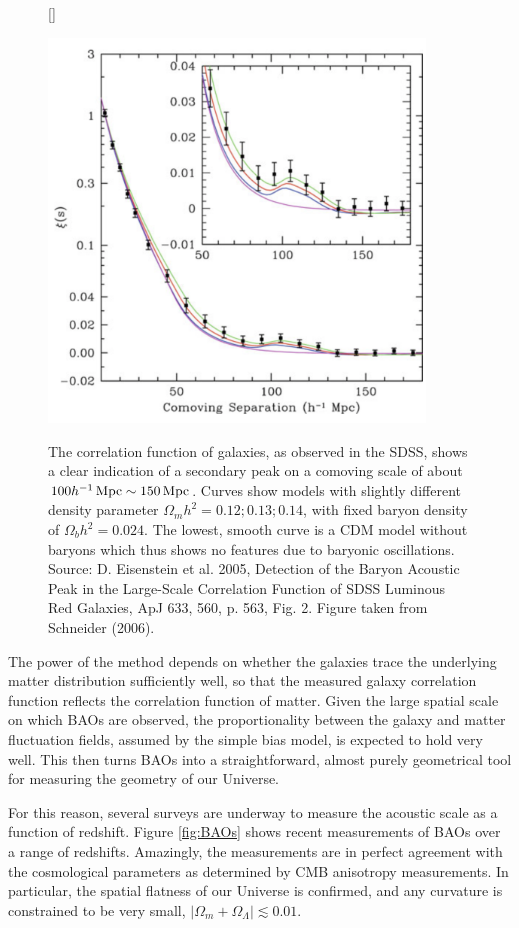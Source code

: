 \documentclass[a4paper,11pt]{article}
\begin{document}
\begin{figure}[h]
    [\FBwidth]
    {\caption{\footnotesize{The correlation function of galaxies, as observed in the SDSS, shows a clear indication of a secondary peak on a comoving scale of about $100h^{-1}\,{\rm Mpc}\sim150\,{\rm Mpc}$. Curves show models with slightly different density parameter $\Omega_mh^2 = 0.12; 0.13; 0.14$, with fixed baryon density of $\Omega_bh^2=0.024$. The lowest, smooth curve is a  CDM model without baryons which thus shows no features due to baryonic oscillations. Source: D. Eisenstein et al. 2005, Detection of the Baryon Acoustic Peak in the Large-Scale Correlation Function of SDSS Luminous Red Galaxies, ApJ 633, 560, p. 563, Fig. 2. Figure taken from Schneider (2006).}}
    \label{fig:correlationfunction}}
    {\includegraphics[width=10cm]{figures/CorrelationFunction.png}}
\end{figure}

{\noindent}The power of the method depends on whether the galaxies trace the underlying matter distribution sufficiently well, so that the measured galaxy correlation function reflects the correlation function of matter. Given the large spatial scale on which BAOs are observed, the proportionality between the galaxy and matter fluctuation fields, assumed by the simple bias model, is expected to hold very well. This then turns BAOs into a straightforward, almost purely geometrical tool for measuring the geometry of our Universe.

{\noindent}For this reason, several surveys are underway to measure the acoustic scale as a function of redshift. Figure \ref{fig:BAOs} shows recent measurements of BAOs over a range of redshifts. Amazingly, the measurements are in perfect agreement with the cosmological parameters as determined by CMB anisotropy measurements. In particular, the spatial flatness of our Universe is confirmed, and any curvature is constrained to be very small, $\lvert\Omega_m+\Omega_\Lambda\rvert\lesssim0.01$.
\end{document}
